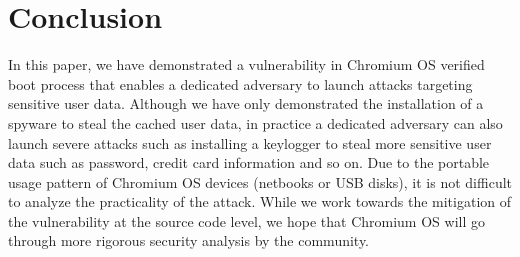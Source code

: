 \documentclass[11pt]{article}
\begin{document}
\section{Conclusion}
In this paper, we have demonstrated a vulnerability in Chromium OS verified boot process that enables a dedicated adversary to launch attacks targeting sensitive user data. Although we have only demonstrated the installation of a spyware to steal the cached user data, in practice a dedicated adversary can also launch severe attacks such as installing a keylogger to steal more sensitive user data such as password, credit card information and so on. Due to the portable usage pattern of Chromium OS devices (netbooks or USB disks), it is not difficult to analyze the practicality of the attack. While we work towards the mitigation of the vulnerability at the source code level, we hope that Chromium OS will go through more rigorous security analysis by the community.







\end{document}
